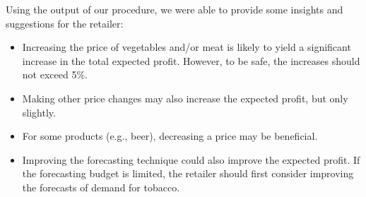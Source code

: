 \documentclass[a4paper,11pt]{article}
\begin{document}
\begin{table}[htb]
\centering
\caption{Margins of profit and Bounds for ranges of validity in \%}
\label{tab:real_sum}
\end{table}

Using the output of our procedure, we were able to provide some insights and suggestions for the retailer:
\begin{itemize}
\item Increasing the price of vegetables and/or meat is likely to yield a significant increase in the total expected profit. However, to be safe, the increases should not exceed 5\%.
\item Making other price changes may also increase the expected profit, but only slightly.
\item For some products (e.g., beer), decreasing a price may be beneficial.
\item Improving the forecasting technique could also improve the expected profit. If the forecasting budget is limited, the retailer should first consider improving the forecasts of demand for tobacco.
\end{itemize}
\end{document}
